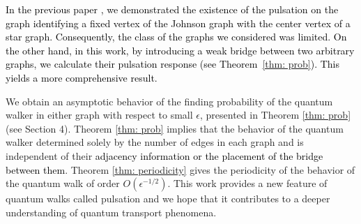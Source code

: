 \documentclass[12pt]{article}
\numberwithin{lemma}{section}
\numberwithin{proposition}{section}
\numberwithin{remark}{section}
\numberwithin{definition}{section}
\newcommand{\red}{\textcolor{black}}
\begin{document}
    \red{
    In the previous paper \cite{TS}, we demonstrated the existence of the pulsation on the graph identifying a fixed vertex of the Johnson graph with the center vertex of a star graph. Consequently, the class of the graphs we considered was limited.
    \red{
    On the other hand, in this work, by introducing a weak bridge between two arbitrary graphs, we calculate their pulsation response (see Theorem~\ref{thm: prob}). This yields a more comprehensive result.}
    }
    
    We obtain an asymptotic behavior of the finding probability of the quantum walker in either graph with respect to small $\epsilon$, presented in Theorem \ref{thm: prob} (see Section 4). Theorem \ref{thm: prob} implies that the behavior of the quantum walker determined solely by the number of edges in each graph and is independent of their \red{adjacency information or the placement of the bridge between them}. Theorem \ref{thm: periodicity} gives the periodicity of the behavior of the quantum walk of order $O(\epsilon^{-1/2})$. 
    This work provides a new feature of quantum walks called pulsation and we hope that it contributes to a deeper understanding of quantum transport phenomena.
    
\end{document}
